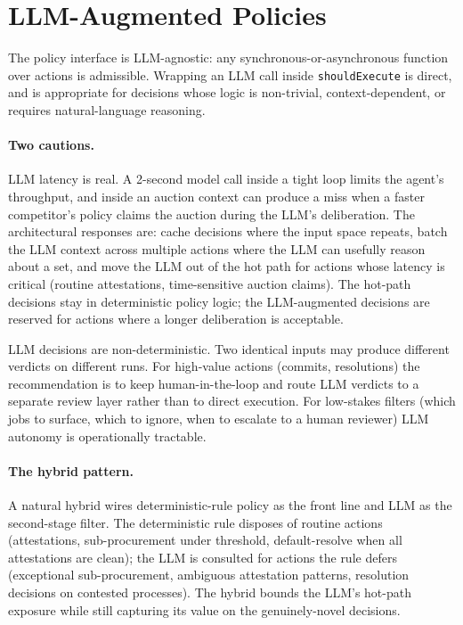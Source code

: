 \documentclass[11pt,a4paper]{article}
\theoremstyle{definition}
\theoremstyle{remark}
\begin{document}
\section{LLM-Augmented Policies}
\label{sec:llm}

The policy interface is LLM-agnostic: any synchronous-or-asynchronous
function over actions is admissible. Wrapping an LLM call inside
\texttt{shouldExecute} is direct, and is appropriate for decisions
whose logic is non-trivial, context-dependent, or requires natural-language
reasoning.

\paragraph{Two cautions.}
LLM latency is real. A 2-second model call inside a tight loop limits
the agent's throughput, and inside an auction context can produce a
miss when a faster competitor's policy claims the auction during the
LLM's deliberation. The architectural responses are: cache decisions
where the input space repeats, batch the LLM context across multiple
actions where the LLM can usefully reason about a set, and move the
LLM out of the hot path for actions whose latency is critical
(routine attestations, time-sensitive auction claims). The hot-path
decisions stay in deterministic policy logic; the LLM-augmented
decisions are reserved for actions where a longer deliberation is
acceptable.

LLM decisions are non-deterministic. Two identical inputs may produce
different verdicts on different runs. For high-value actions (commits,
resolutions) the recommendation is to keep human-in-the-loop and
route LLM verdicts to a separate review layer rather than to direct
execution. For low-stakes filters (which jobs to surface, which to
ignore, when to escalate to a human reviewer) LLM autonomy is
operationally tractable.

\paragraph{The hybrid pattern.}
A natural hybrid wires deterministic-rule policy as the front line
and LLM as the second-stage filter. The deterministic rule disposes
of routine actions (attestations, sub-procurement under threshold,
default-resolve when all attestations are clean); the LLM is consulted
for actions the rule defers (exceptional sub-procurement, ambiguous
attestation patterns, resolution decisions on contested processes).
The hybrid bounds the LLM's hot-path exposure while still capturing
its value on the genuinely-novel decisions.
\end{document}
